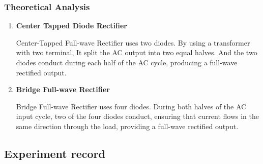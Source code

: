     \subsubsection{Theoretical Analysis}
        \begin{enumerate}[a]
            \item \textbf{Center Tapped Diode Rectifier}\par
                Center-Tapped Full-wave Rectifier uses two diodes. By using a transformer with two terminal, It split the AC output into two equal halves. And the two diodes conduct during each half of the AC cycle, producing a full-wave rectified output.
            \item \textbf{Bridge Full-wave Rectifier}\par
                Bridge Full-wave Rectifier uses four diodes. During both halves of the AC input cycle, two of the four diodes conduct, ensuring that current flows in the same direction through the load, providing a full-wave rectified output.
        \end{enumerate}

\subsection{Experiment record}
